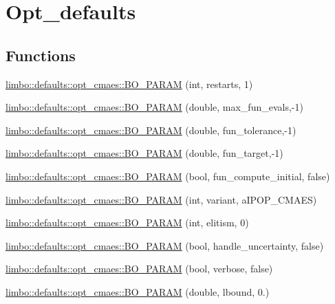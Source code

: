 \hypertarget{group__opt__defaults}{}\section{Opt\+\_\+defaults}
\label{group__opt__defaults}
\subsection*{Functions}
\begin{DoxyCompactItemize}
\item 
\hyperlink{group__opt__defaults_gaba7127b5e591a72095bd6c3a4155828d}{limbo\+::defaults\+::opt\+\_\+cmaes\+::\+B\+O\+\_\+\+P\+A\+R\+AM} (int, restarts, 1)
\item 
\hyperlink{group__opt__defaults_ga5130bd236acff913c59380059474ebab}{limbo\+::defaults\+::opt\+\_\+cmaes\+::\+B\+O\+\_\+\+P\+A\+R\+AM} (double, max\+\_\+fun\+\_\+evals,-\/1)
\item 
\hyperlink{group__opt__defaults_ga5f980ba02cafe6ee52d6b9cd485e3d05}{limbo\+::defaults\+::opt\+\_\+cmaes\+::\+B\+O\+\_\+\+P\+A\+R\+AM} (double, fun\+\_\+tolerance,-\/1)
\item 
\hyperlink{group__opt__defaults_ga1b4276da9161bb04b84b4cd9307a37ab}{limbo\+::defaults\+::opt\+\_\+cmaes\+::\+B\+O\+\_\+\+P\+A\+R\+AM} (double, fun\+\_\+target,-\/1)
\item 
\hyperlink{group__opt__defaults_ga14aff955e1360233e5ac361bdd2f3118}{limbo\+::defaults\+::opt\+\_\+cmaes\+::\+B\+O\+\_\+\+P\+A\+R\+AM} (bool, fun\+\_\+compute\+\_\+initial, false)
\item 
\hyperlink{group__opt__defaults_gaf6fe5f409527ed056cee8cf8df52da9e}{limbo\+::defaults\+::opt\+\_\+cmaes\+::\+B\+O\+\_\+\+P\+A\+R\+AM} (int, variant, a\+I\+P\+O\+P\+\_\+\+C\+M\+A\+ES)
\item 
\hyperlink{group__opt__defaults_ga660850db2d1f35863416f9790fe5125e}{limbo\+::defaults\+::opt\+\_\+cmaes\+::\+B\+O\+\_\+\+P\+A\+R\+AM} (int, elitism, 0)
\item 
\hyperlink{group__opt__defaults_gad4f97065dd716df6c84e093059ab39f6}{limbo\+::defaults\+::opt\+\_\+cmaes\+::\+B\+O\+\_\+\+P\+A\+R\+AM} (bool, handle\+\_\+uncertainty, false)
\item 
\hyperlink{group__opt__defaults_gae78e735b53742e438847fb63817f2ed1}{limbo\+::defaults\+::opt\+\_\+cmaes\+::\+B\+O\+\_\+\+P\+A\+R\+AM} (bool, verbose, false)
\item 
\hyperlink{group__opt__defaults_ga0af64a0a2ea5ba01473e0cf284154dea}{limbo\+::defaults\+::opt\+\_\+cmaes\+::\+B\+O\+\_\+\+P\+A\+R\+AM} (double, lbound, 0.)

\end{DoxyCompactItemize}
